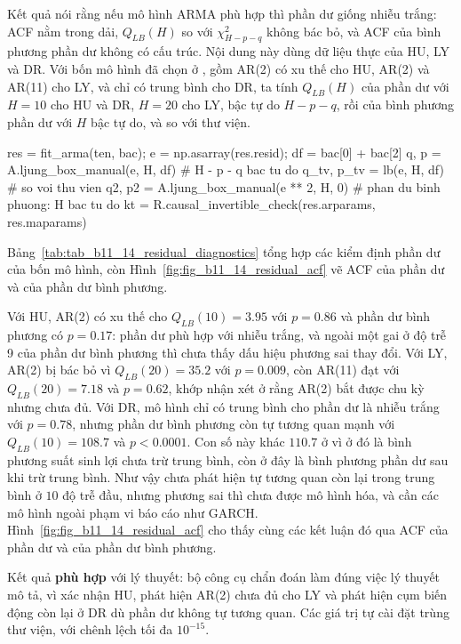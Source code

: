  Kết quả  nói rằng nếu mô hình ARMA phù hợp thì phần dư giống nhiễu trắng: ACF nằm trong dải, $Q_{LB}(H)$ so với $\chi^2_{H-p-q}$ không bác bỏ, và ACF của bình phương phần dư không có cấu trúc.
 Nội dung này dùng dữ liệu thực của HU, LY và DR. Với bốn mô hình đã chọn ở , gồm AR(2) có xu thế cho HU, AR(2) và AR(11) cho LY, và chỉ có trung bình cho DR, ta tính $Q_{LB}(H)$ của phần dư với $H=10$ cho HU và DR, $H=20$ cho LY, bậc tự do $H-p-q$, rồi của bình phương phần dư với $H$ bậc tự do, và so với thư viện.
\begin{codeblock}
res = fit_arma(ten, bac); e = np.asarray(res.resid); df = bac[0] + bac[2]
q, p = A.ljung_box_manual(e, H, df)              # H - p - q bac tu do
q_tv, p_tv = lb(e, H, df)                         # so voi thu vien
q2, p2 = A.ljung_box_manual(e ** 2, H, 0)         # phan du binh phuong: H bac tu do
kt = R.causal_invertible_check(res.arparams, res.maparams)
\end{codeblock}
 Bảng~\ref{tab:tab_b11_14_residual_diagnostics} tổng hợp các kiểm định phần dư của bốn mô hình, còn Hình~\ref{fig:fig_b11_14_residual_acf} vẽ ACF của phần dư và của phần dư bình phương.

 Với HU, AR(2) có xu thế cho $Q_{LB}(10)=3.95$ với $p=0.86$ và phần dư bình phương có $p=0.17$: phần dư phù hợp với nhiễu trắng, và ngoài một gai ở độ trễ 9 của phần dư bình phương thì chưa thấy dấu hiệu phương sai thay đổi. Với LY, AR(2) bị bác bỏ vì $Q_{LB}(20)=35.2$ với $p=0.009$, còn AR(11) đạt với $Q_{LB}(20)=7.18$ và $p=0.62$, khớp nhận xét ở  rằng AR(2) bắt được chu kỳ nhưng chưa đủ. Với DR, mô hình chỉ có trung bình cho phần dư là nhiễu trắng với $p=0.78$, nhưng phần dư bình phương còn tự tương quan mạnh với $Q_{LB}(10)=108.7$ và $p<0.0001$. Con số này khác $110.7$ ở  vì ở đó là bình phương suất sinh lợi chưa trừ trung bình, còn ở đây là bình phương phần dư sau khi trừ trung bình. Như vậy chưa phát hiện tự tương quan còn lại trong trung bình ở $10$ độ trễ đầu, nhưng phương sai thì chưa được mô hình hóa, và cần các mô hình ngoài phạm vi báo cáo như GARCH. Hình~\ref{fig:fig_b11_14_residual_acf} cho thấy cùng các kết luận đó qua ACF của phần dư và của phần dư bình phương.

 Kết quả \textbf{phù hợp} với lý thuyết: bộ công cụ chẩn đoán làm đúng việc lý thuyết mô tả, vì xác nhận HU, phát hiện AR(2) chưa đủ cho LY và phát hiện cụm biến động còn lại ở DR dù phần dư không tự tương quan. Các giá trị tự cài đặt trùng thư viện, với chênh lệch tối đa $10^{-15}$.
